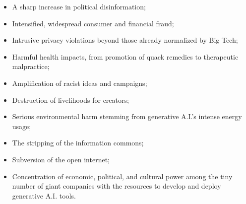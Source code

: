 \begin{itemize}
\item A sharp increase in political disinformation;
\item Intensified, widespread consumer and financial fraud;
\item Intrusive privacy violations beyond those already normalized by Big Tech;
\item Harmful health impacts, from promotion of quack remedies to therapeutic malpractice;
\item Amplification of racist ideas and campaigns;
\item Destruction of livelihoods for creators;
\item Serious environmental harm stemming from generative A.I.’s intense energy usage;
\item The stripping of the information commons;
\item Subversion of the open internet;
\item Concentration of economic, political, and cultural power among the tiny number of giant companies with the resources to develop and deploy generative A.I. tools.
\end{itemize}

